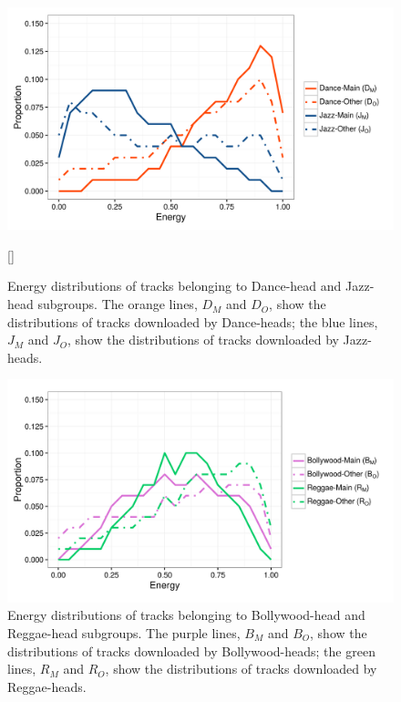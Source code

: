 \documentclass[a4paper]{article}
\begin{document}
\begin{figure}[h!]
\centering
\includegraphics[width=\linewidth]{good_4lines}
\caption[Energy Distribution (Dance- and Jazz-heads)]{Energy distributions of tracks belonging to Dance-head and Jazz-head subgroups. The orange lines, $D_M$ and $D_O$, show the distributions of tracks downloaded by Dance-heads; the blue lines, $J_M$ and $J_O$, show the distributions of  tracks downloaded by Jazz-heads.}[]
\label{good_4lines}
\end{figure}

\begin{figure}[h!]
\centering
\includegraphics[width=\linewidth]{bad_4lines}
\caption[Energy Distribution (Bollywood- and Reggae-heads)]{Energy distributions of tracks belonging to Bollywood-head and Reggae-head subgroups. The purple lines, $B_M$ and $B_O$, show the distributions of tracks downloaded by Bollywood-heads; the green lines, $R_M$ and $R_O$, show the distributions of tracks downloaded by Reggae-heads.}
\label{bad_4lines}
\end{figure}
\end{document}
